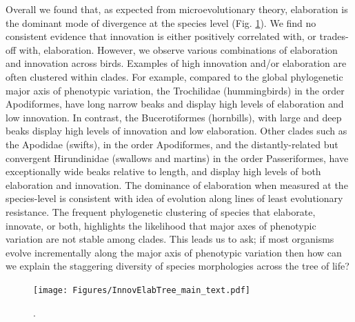 \documentclass[12pt,letterpaper]{article}
\begin{document}
Overall we found that, as expected from microevolutionary theory, elaboration is the dominant mode of divergence at the species level (Fig. \ref{Fig:phylogeny}).
We find no consistent evidence that innovation is either positively correlated with, or trades-off with, elaboration. %
However, we observe various combinations of elaboration and innovation across birds.
Examples of high innovation and/or elaboration are often clustered within clades.
For example, compared to the global phylogenetic major axis of phenotypic variation, the Trochilidae (hummingbirds) in the order Apodiformes, have long narrow beaks and display high levels of elaboration and low innovation.
In contrast, the Bucerotiformes (hornbills), with large and deep beaks display high levels of innovation and low elaboration.
Other clades such as the Apodidae (swifts), in the order Apodiformes, and the distantly-related but convergent Hirundinidae (swallows and martins) in the order Passeriformes, have exceptionally wide beaks relative to length, and display high levels of both elaboration and innovation.
The dominance of elaboration when measured at the species-level is consistent with idea of evolution along lines of least evolutionary resistance.
The frequent phylogenetic clustering of species that elaborate, innovate, or both, highlights the likelihood that major axes of phenotypic variation are not stable among clades.
This leads us to ask; if most organisms evolve incrementally along the major axis of phenotypic variation then how can we explain the staggering diversity of species morphologies across the tree of life? 

\begin{figure}[!htbp]
\centering
    \texttt{[image: Figures/InnovElabTree\_main\_text.pdf]}
\caption{.}
\label{Fig:phylogeny}
\end{figure}


\bigskip
\end{document}
